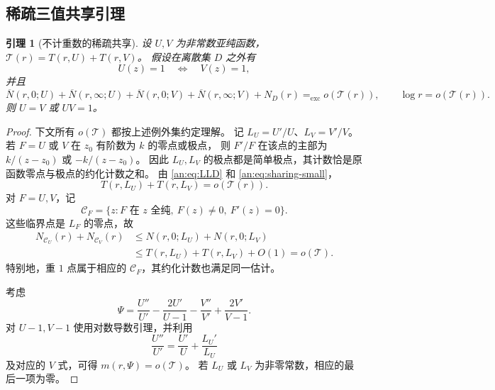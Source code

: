 \documentclass[11pt,a4paper,oneside,openany]{book}
\theoremstyle{lecture}
\newtheorem{lemma}[theorem]{引理}
\newcommand{\exceq}{\mathrel{=_{\mathrm{exc}}}}
\newcommand{\bN}{\overline N}
\newcommand{\TT}{\mathcal T}
\numberwithin{equation}{section}
\begin{document}
\subsection{稀疏三值共享引理}
\begin{lemma}[不计重数的稀疏共享]\label{an:lem:sharing}
设 $U,V$ 为非常数亚纯函数，$\TT(r)=T(r,U)+T(r,V)$。
假设在离散集 $D$ 之外有
\[
 U(z)=1\quad\Longleftrightarrow\quad V(z)=1,
\]
并且
\begin{equation}\label{an:eq:sharing-small}
 \bN(r,0;U)+\bN(r,\infty;U)+\bN(r,0;V)+\bN(r,\infty;V)+N_D(r)
 \exceq o(\TT(r)),\qquad \log r=o(\TT(r)).
\end{equation}
则 $U=V$ 或 $UV=1$。
\end{lemma}
\begin{proof}
下文所有 $o(\TT)$ 都按上述例外集约定理解。
记 $L_U=U'/U$、$L_V=V'/V$。
若 $F=U$ 或 $V$ 在 $z_0$ 有阶数为 $k$ 的零点或极点，
则 $F'/F$ 在该点的主部为 $k/(z-z_0)$ 或 $-k/(z-z_0)$。
因此 $L_U,L_V$ 的极点都是简单极点，其计数恰是原函数零点与极点的约化计数之和。
由 \eqref{an:eq:LLD} 和 \eqref{an:eq:sharing-small}，
\begin{equation}\label{an:eq:logder-small}
 T(r,L_U)+T(r,L_V)=o(\TT(r)).
\end{equation}
对 $F=U,V$，记
\[
 \mathcal C_F=\{z:F\text{ 在 }z\text{ 全纯},\ F(z)\ne0,\ F'(z)=0\}.
\]
这些临界点是 $L_F$ 的零点，故
\begin{equation}\label{an:eq:sharing-critical}
 \begin{aligned}
 N_{\mathcal C_U}(r)+N_{\mathcal C_V}(r)
 &\le N(r,0;L_U)+N(r,0;L_V)\\
 &\le T(r,L_U)+T(r,L_V)+O(1)=o(\TT).
 \end{aligned}
\end{equation}
特别地，重 $1$ 点属于相应的 $\mathcal C_F$，其约化计数也满足同一估计。

考虑
\begin{equation}\label{an:eq:Psi}
 \Psi=\frac{U''}{U'}-\frac{2U'}{U-1}
       -\frac{V''}{V'}+\frac{2V'}{V-1}.
\end{equation}
对 $U-1,V-1$ 使用对数导数引理，并利用
\[
 \frac{U''}{U'}=\frac{U'}U+\frac{L_U'}{L_U}
\]
及对应的 $V$ 式，可得 $m(r,\Psi)=o(\TT)$。
若 $L_U$ 或 $L_V$ 为非零常数，相应的最后一项为零。


\end{proof}
\end{document}
